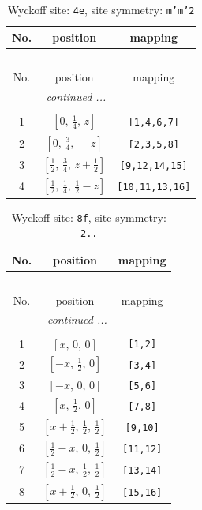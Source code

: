 \documentclass[fleqn,8pt]{jsarticle}
\begin{document}
\renewcommand{\arraystretch}{1.2}
\begin{longtable}{ccc}
\caption{Wyckoff site: {\tt 4e}, site symmetry: {\tt m'm'2}}
 \\
 \hline \hline
No. & position & mapping \\ \hline \endfirsthead

\multicolumn{2}{l}{\tablename\ \thetable{}} \\
 \hline \hline
No. & position & mapping \\ \hline \endhead

 \hline \hline
\multicolumn{2}{r}{\footnotesize\it continued ...} \\ \endfoot

 \hline \hline
\multicolumn{2}{r}{} \\ \endlastfoot

1 & $\left[ 0,\, \frac{1}{4},\, z \right]$ & {\tt [1,4,6,7]} \\ \hline
2 & $\left[ 0,\, \frac{3}{4},\, - z \right]$ & {\tt [2,3,5,8]} \\ \hline
3 & $\left[ \frac{1}{2},\, \frac{3}{4},\, z + \frac{1}{2} \right]$ & {\tt [9,12,14,15]} \\ \hline
4 & $\left[ \frac{1}{2},\, \frac{1}{4},\, \frac{1}{2} - z \right]$ & {\tt [10,11,13,16]} \\
\end{longtable}
\renewcommand{\arraystretch}{1.2}
\begin{longtable}{ccc}
\caption{Wyckoff site: {\tt 8f}, site symmetry: {\tt 2..}}
 \\
 \hline \hline
No. & position & mapping \\ \hline \endfirsthead

\multicolumn{2}{l}{\tablename\ \thetable{}} \\
 \hline \hline
No. & position & mapping \\ \hline \endhead

 \hline \hline
\multicolumn{2}{r}{\footnotesize\it continued ...} \\ \endfoot

 \hline \hline
\multicolumn{2}{r}{} \\ \endlastfoot

1 & $\left[ x,\, 0,\, 0 \right]$ & {\tt [1,2]} \\ \hline
2 & $\left[ - x,\, \frac{1}{2},\, 0 \right]$ & {\tt [3,4]} \\ \hline
3 & $\left[ - x,\, 0,\, 0 \right]$ & {\tt [5,6]} \\ \hline
4 & $\left[ x,\, \frac{1}{2},\, 0 \right]$ & {\tt [7,8]} \\ \hline
5 & $\left[ x + \frac{1}{2},\, \frac{1}{2},\, \frac{1}{2} \right]$ & {\tt [9,10]} \\ \hline
6 & $\left[ \frac{1}{2} - x,\, 0,\, \frac{1}{2} \right]$ & {\tt [11,12]} \\ \hline
7 & $\left[ \frac{1}{2} - x,\, \frac{1}{2},\, \frac{1}{2} \right]$ & {\tt [13,14]} \\ \hline
8 & $\left[ x + \frac{1}{2},\, 0,\, \frac{1}{2} \right]$ & {\tt [15,16]} \\
\end{longtable}
\end{document}
